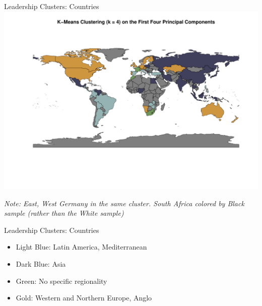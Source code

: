 \documentclass[
  ignorenonframetext,
]{beamer}
\providecommand{\tightlist}{%
  \setlength{\itemsep}{0pt}\setlength{\parskip}{0pt}}
\begin{document}
\begin{frame}{Leadership Clusters: Countries}
\protect\hypertarget{leadership-clusters-countries}{}
\includegraphics{final_slides_files/figure-beamer/kmeans-1.pdf}

\emph{Note: East, West Germany in the same cluster. South Africa colored
by Black sample (rather than the White sample)}
\end{frame}

\begin{frame}{Leadership Clusters: Countries}
\protect\hypertarget{leadership-clusters-countries-1}{}

\begin{itemize}
\tightlist
\item
  \textcolor{clust4}{Light Blue}: Latin America, Mediterranean
\item
  \textcolor{clust5}{Dark Blue}: Asia
\item
  \textcolor{clust6}{Green}: No specific regionality
\item
  \textcolor{clust7}{Gold}: Western and Northern Europe, Anglo
\end{itemize}
\end{frame}
\end{document}

